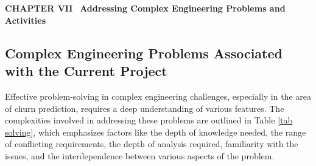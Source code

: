 \section*{}
\begin{center}
{\fontsize{14}{1.5}\selectfont \textbf{CHAPTER VII}}\
\vspace{12pt}
{\fontsize{16}{1.5}\selectfont \textbf{Addressing Complex Engineering Problems and Activities}}\
\vspace{12pt}
\vspace{12pt}
\end{center}

\setcounter{section}{7}
\setcounter{subsection}{0}
\setcounter{table}{0}
\setcounter{figure}{0}

\subsection{Complex Engineering Problems Associated with the Current Project}

Effective problem-solving in complex engineering challenges, especially in the area of churn prediction, requires a deep understanding of various features. The complexities involved in addressing these problems are outlined in Table \ref{tab
solving}, which emphasizes factors like the depth of knowledge needed, the range of conflicting requirements, the depth of analysis required, familiarity with the issues, and the interdependence between various aspects of the problem.

